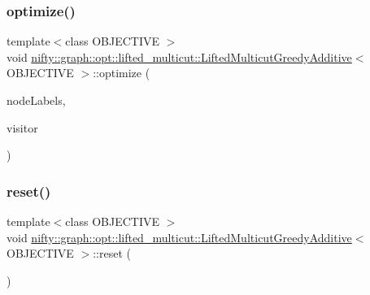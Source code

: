 \subsubsection{\texorpdfstring{optimize()}{optimize()}}
{\footnotesize\ttfamily template$<$class O\+B\+J\+E\+C\+T\+I\+VE $>$ \\
void \hyperlink{classnifty_1_1graph_1_1opt_1_1lifted__multicut_1_1LiftedMulticutGreedyAdditive}{nifty\+::graph\+::opt\+::lifted\+\_\+multicut\+::\+Lifted\+Multicut\+Greedy\+Additive}$<$ O\+B\+J\+E\+C\+T\+I\+VE $>$\+::optimize (\begin{DoxyParamCaption}\item[{\hyperlink{classnifty_1_1graph_1_1opt_1_1lifted__multicut_1_1LiftedMulticutGreedyAdditive_a67a2931a00a97fa2838ed9ae1158c7bf}{Node\+Labels\+Type} \&}]{node\+Labels,  }\item[{\hyperlink{classnifty_1_1graph_1_1opt_1_1lifted__multicut_1_1LiftedMulticutGreedyAdditive_a7ae8f1d5534419d919200ed5e74f0f2a}{Visitor\+Base\+Type} $\ast$}]{visitor }\end{DoxyParamCaption})\hspace{0.3cm}{\ttfamily [virtual]}}

\mbox{\label{classnifty_1_1graph_1_1opt_1_1lifted__multicut_1_1LiftedMulticutGreedyAdditive_a81e26cea95a4148beac1ebb4bb16efcd}} 
\subsubsection{\texorpdfstring{reset()}{reset()}}
{\footnotesize\ttfamily template$<$class O\+B\+J\+E\+C\+T\+I\+VE $>$ \\
void \hyperlink{classnifty_1_1graph_1_1opt_1_1lifted__multicut_1_1LiftedMulticutGreedyAdditive}{nifty\+::graph\+::opt\+::lifted\+\_\+multicut\+::\+Lifted\+Multicut\+Greedy\+Additive}$<$ O\+B\+J\+E\+C\+T\+I\+VE $>$\+::reset (\begin{DoxyParamCaption}{ }\end{DoxyParamCaption})}

\mbox{\label{classnifty_1_1graph_1_1opt_1_1lifted__multicut_1_1LiftedMulticutGreedyAdditive_a13ed6cbca21df0bb7fc22d298533e4a7}} 
